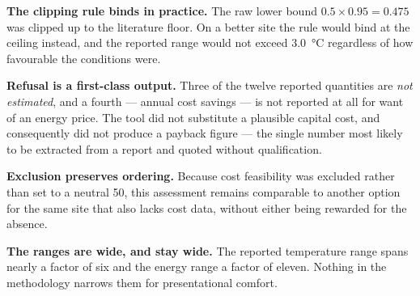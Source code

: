 \textbf{The clipping rule binds in practice.} The raw lower bound
$0.5 \times 0.95 = 0.475$ was clipped up to the literature floor. On a better
site the rule would bind at the ceiling instead, and the reported range would
not exceed \qty{3.0}{\degreeCelsius} regardless of how favourable the
conditions were.

\textbf{Refusal is a first-class output.} Three of the twelve reported
quantities are \emph{not estimated}, and a fourth --- annual cost savings ---
is not reported at all for want of an energy price. The tool did not substitute
a plausible
capital cost, and consequently did not produce a payback figure --- the single
number most likely to be extracted from a report and quoted without
qualification.

\textbf{Exclusion preserves ordering.} Because cost feasibility was excluded
rather than set to a neutral 50, this assessment remains comparable to another
option for the same site that also lacks cost data, without either being
rewarded for the absence.

\textbf{The ranges are wide, and stay wide.} The reported temperature range
spans nearly a factor of six and the energy range a factor of eleven. Nothing
in the methodology narrows them for presentational comfort.
